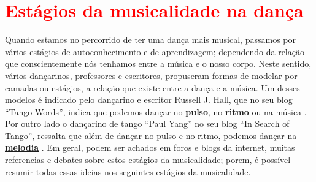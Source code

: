 
\section{\textcolor{red}{Estágios da musicalidade na dança}}
\label{sec:aspectosusicalidade}
Quando estamos no percorrido de ter uma dança mais musical,
passamos por vários estágios de autoconhecimento e de aprendizagem; 
dependendo da relação que conscientemente nós tenhamos entre a música e o nosso corpo.
Neste sentido, vários dançarinos, professores e escritores,
propuseram formas de modelar por camadas ou estágios, a relação que existe entre a dança e a música.
Um desses modelos é indicado pelo dançarino e escritor Russell J. Hall,
que no seu blog ``Tango Words'', 
indica que podemos dançar no \hyperref[ref:Pulso]{\textbf{pulso}}, 
no \hyperref[sec:pos:Ritmo]{\textbf{ritmo}} ou na música \cite{TangoWordsEstagiosMusicalidade1}.
Por outro lado o dançarino de tango ``Paul Yang'' no seu blog ``In Search of Tango'',
ressalta que além de dançar no pulso e no ritmo, 
podemos  dançar na \hyperref[sec:pos:Melodia]{\textbf{melodia}} \cite{InSearchOfTangoEstagiosMusicalidade1}.
Em geral, podem ser achados em foros e blogs da internet,
muitas referencias e debates sobre estos estágios da musicalidade;
porem, é possível resumir todas essas ideias nos seguintes estágios da musicalidade.

